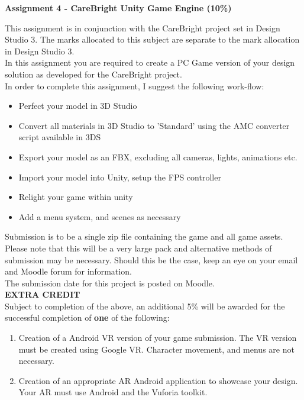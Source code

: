 
	
\begin{flushleft}
\Large\textbf{Assignment 4 - CareBright Unity Game Engine (10\%)}\\
\end{flushleft}

This assignment is in conjunction with the CareBright project set in Design Studio 3.  The marks allocated to this subject are separate to the mark allocation in Design Studio 3.\\

In this assignment you are required to create a PC Game version of your design solution as developed for the CareBright project.\\

In order to complete this assignment, I suggest the following work-flow:

\begin{itemize}
	\item Perfect your model in 3D Studio
	\item Convert all materials in 3D Studio to 'Standard' using the AMC converter script available in 3DS
	\item Export your model as an FBX, excluding all cameras, lights, animations etc.
	\item Import your model into Unity, setup the FPS controller
	\item Relight your game within unity
	\item Add a menu system, and scenes as necessary
\end{itemize}

Submission is to be a single zip file containing the game and all game assets.  Please note that this will be a very large pack and alternative methods of submission may be necessary.  Should this be the case, keep an eye on your email and Moodle forum for information.\\

The submission date for this project is posted on Moodle.\\

\textbf{EXTRA CREDIT}\\
Subject to completion of the above, an additional 5\% will be awarded for the successful completion of \textbf{one} of the following:
\begin{enumerate}
	\item Creation of a Android VR version of your game submission.  The VR version must be created using Google VR.  Character movement, and menus are not necessary.
	\item Creation of an appropriate AR Android application to showcase your design.  Your AR must use Android and the Vuforia toolkit.
\end{enumerate}


